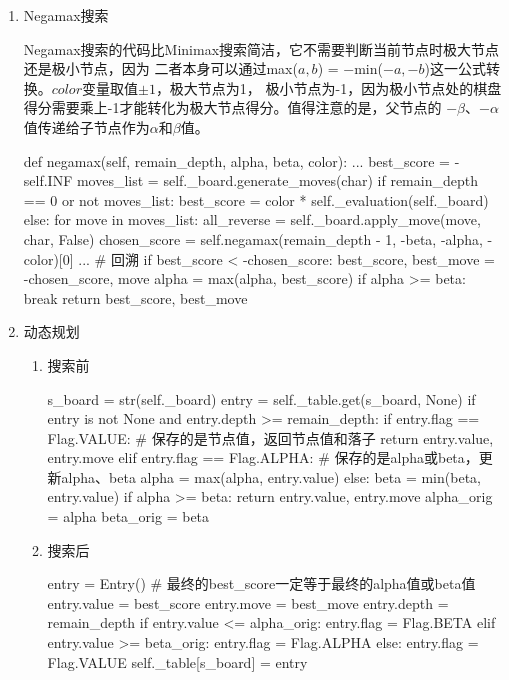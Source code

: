 \documentclass[10pt,letterpaper]{ctexart}
\begin{document}
\begin{enumerate}[itemindent=2.5em,label=\arabic*、]
  \item Negamax搜索
  \par \qquad Negamax搜索的代码比Minimax搜索简洁，它不需要判断当前节点时极大节点还是极小节点，因为
  二者本身可以通过max($a,b$) = $-$min($-a, -b$)这一公式转换。$color$变量取值$\pm 1$，极大节点为1，
  极小节点为-1，因为极小节点处的棋盘得分需要乘上-1才能转化为极大节点得分。值得注意的是，父节点的
  $-\beta$、$-\alpha$值传递给子节点作为$\alpha$和$\beta$值。
\begin{python}
def negamax(self, remain_depth, alpha, beta, color):
  ...
  best_score = -self.INF
  moves_list = self._board.generate_moves(char)
  if remain_depth == 0 or not moves_list:
      best_score = color * self._evaluation(self._board)
  else:
    for move in moves_list:
      all_reverse = self._board.apply_move(move, char, False)
      chosen_score = self.negamax(remain_depth - 1, -beta, -alpha, -color)[0]
      ... # 回溯
      if best_score < -chosen_score:
          best_score, best_move = -chosen_score, move
      alpha = max(alpha, best_score)
      if alpha >= beta:
          break
  return best_score, best_move
\end{python}
  \item 动态规划
  \begin{enumerate}[itemindent=3.5em,label=(\arabic*)]
    \item 搜索前
      \begin{python}
  s_board = str(self._board)
  entry = self._table.get(s_board, None)
  if entry is not None and entry.depth >= remain_depth:
      if entry.flag == Flag.VALUE:    # 保存的是节点值，返回节点值和落子
          return entry.value, entry.move
      elif entry.flag == Flag.ALPHA:   # 保存的是alpha或beta，更新alpha、beta
          alpha = max(alpha, entry.value)
      else:
          beta = min(beta, entry.value)
      if alpha >= beta:
          return entry.value, entry.move
  alpha_orig = alpha
  beta_orig = beta
      \end{python}
    \item 搜索后
      \begin{python}
  entry = Entry()
  # 最终的best_score一定等于最终的alpha值或beta值
  entry.value = best_score
  entry.move = best_move
  entry.depth = remain_depth
  if entry.value <= alpha_orig:
      entry.flag = Flag.BETA
  elif entry.value >= beta_orig:
      entry.flag = Flag.ALPHA
  else:
      entry.flag = Flag.VALUE
  self._table[s_board] = entry
      \end{python}
  \end{enumerate}
\end{enumerate}
\end{document}
